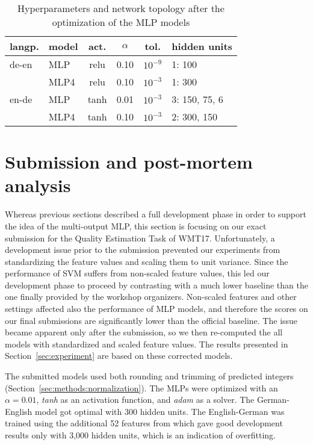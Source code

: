 \documentclass[11pt,letterpaper]{article}
\newcommand*\rot{\multicolumn{1}{R{30}{1em}}}%
\begin{document}
\begin{table}[ht]
\center
\setlength\tabcolsep{4pt}
\begin{tabular}{llcccl}
\toprule
langp. & model & act. & $\alpha$ & tol. & hidden units \\
\midrule
de-en 	& MLP 	& relu	& 0.10	& $10^{-9}$ & 1: 100		\\	 
		& MLP4  & relu	& 0.10	& $10^{-3}$ & 1: 300 		\\				 
en-de 	& MLP   & tanh 	& 0.01	& $10^{-3}$ & 3: 150, 75, 6 \\
   		& MLP4	& tanh  & 0.10  & $10^{-3}$ & 2: 300, 150	\\
\bottomrule
\end{tabular}
\caption{Hyperparameters and network topology after the optimization of the MLP
models}
\label{tab:hyperparameters_mlp}
\end{table}


\section{Submission and post-mortem analysis}
\label{sec:submission}

Whereas previous sections described a full development phase in order to support
the idea of the multi-output MLP, this section is focusing on our exact
submission for the Quality Estimation Task of WMT17.
Unfortunately, a development issue prior to the submission prevented our
experiments from standardizing the feature values and scaling them to unit
variance. Since the performance of SVM suffers from non-scaled feature values,
this led our development phase to proceed by contrasting with a much lower
baseline than the one finally provided by the workshop organizers. Non-scaled
features and other settings affected also the performance of MLP models, and
therefore the scores on our final submissions are significantly lower than the official baseline. The
issue became apparent only after the submission, so we then re-computed the all
models with standardized and scaled feature values. The results presented in
Section~\ref{sec:experiment} are based on these corrected models.


The submitted models used both rounding and trimming of predicted integers
(Section~\ref{sec:methods:normalization}).
The MLPs were optimized with an $\alpha=0.01$, \emph{tanh} as an activation
function, and \emph{adam} as a solver. The German-English model got optimal with
300 hidden units.
The English-German was trained using the additional 52 features from
\citet{pub9044} which gave good development results only with 3,000 hidden
units, which is an indication of overfitting.
\end{document}
